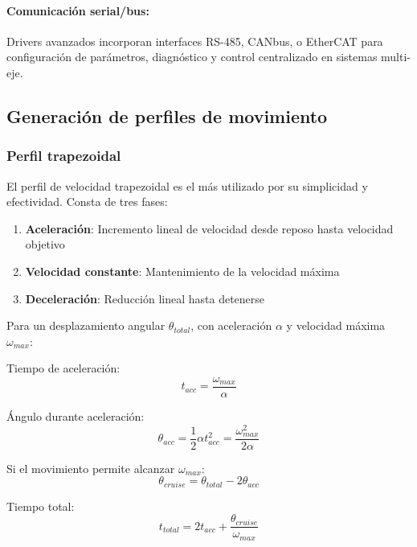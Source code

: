 \paragraph{Comunicación serial/bus:}

Drivers avanzados incorporan interfaces RS-485, CANbus, o EtherCAT para configuración de parámetros, diagnóstico y control centralizado en sistemas multi-eje.

\subsection{Generación de perfiles de movimiento}

\subsubsection{Perfil trapezoidal}

El perfil de velocidad trapezoidal es el más utilizado por su simplicidad y efectividad. Consta de tres fases:

\begin{enumerate}
    \item \textbf{Aceleración}: Incremento lineal de velocidad desde reposo hasta velocidad objetivo
    \item \textbf{Velocidad constante}: Mantenimiento de la velocidad máxima
    \item \textbf{Deceleración}: Reducción lineal hasta detenerse
\end{enumerate}

Para un desplazamiento angular $\theta_{total}$, con aceleración $\alpha$ y velocidad máxima $\omega_{max}$:

Tiempo de aceleración:
\begin{equation}
t_{acc} = \frac{\omega_{max}}{\alpha}
\end{equation}

Ángulo durante aceleración:
\begin{equation}
\theta_{acc} = \frac{1}{2}\alpha t_{acc}^2 = \frac{\omega_{max}^2}{2\alpha}
\end{equation}

Si el movimiento permite alcanzar $\omega_{max}$:
\begin{equation}
\theta_{cruise} = \theta_{total} - 2\theta_{acc}
\end{equation}

Tiempo total:
\begin{equation}
t_{total} = 2t_{acc} + \frac{\theta_{cruise}}{\omega_{max}}
\end{equation}

